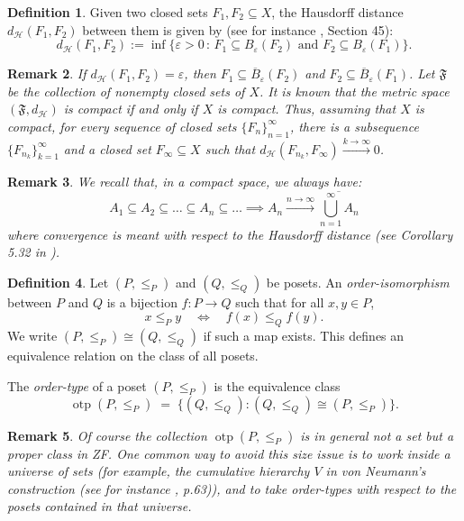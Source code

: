 \documentclass[10pt,a4paper]{article}
\theoremstyle{definition}
\newtheorem{defi}{Definition}[section]
\theoremstyle{remark}
\theoremstyle{plain}
\newtheorem{rem}[defi]{Remark}
\begin{document}
\begin{defi}
    Given two closed sets $F_1,F_2\subseteq X$, the Hausdorff distance $d_{\mathcal{H}}(F_1,F_2)$ between them is given by (see for instance \cite{munkres2013}, Section 45):
    $$d_\mathcal{H}(F_1,F_2):=\inf\{\varepsilon>0\,:\,F_1\subseteq B_\varepsilon(F_2)\text{ and }F_2\subseteq B_\varepsilon(F_1)\}.$$
\end{defi}
\begin{rem}
    If $d_\mathcal{H}(F_1,F_2)=\varepsilon$, then $F_1\subseteq\overline{B}_\varepsilon(F_2)$ and $F_2\subseteq\overline{B}_\varepsilon(F_1)$.
    Let $\mathfrak{F}$ be the collection of nonempty closed sets of $X$. It is known that the metric space $(\mathfrak{F},d_\mathcal{H})$ is compact if and only if $X$ is compact. Thus, assuming that $X$ is compact, for every sequence of closed sets $\{F_n\}_{n=1}^\infty$, there is a subsequence $\{F_{n_k}\}_{k=1}^\infty$ and a closed set $F_\infty\subseteq X$ such that $d_\mathcal{H}(F_{n_k},F_\infty)\xrightarrow{k\to\infty}0$.
\end{rem}
\begin{rem}
    We recall that, in a compact space, we always have:
\begin{equation}\label{nest_haus}
A_1\subseteq A_2\subseteq\dots \subseteq A_n\subseteq\dots \implies A_n\xrightarrow{n\to\infty}\overline{\bigcup_{n=1}^\infty A_n}
\end{equation}
where convergence is meant with respect to the Hausdorff distance (see Corollary 5.32 in \cite{Tuzhilin}).
\end{rem}

\begin{defi}
    Let $(P,\leq_P)$ and $(Q,\leq_Q)$ be posets. An \emph{order-isomorphism} between $P$ and $Q$ is a bijection $f : P \to Q$ such that for all $x,y \in P$,
    $$x \leq_P y \quad \Longleftrightarrow \quad f(x) \leq_Q f(y).$$
    We write $(P,\leq_P) \cong (Q,\leq_Q)$ if such a map exists. This defines an equivalence relation on the class of all posets.

    The \emph{order-type} of a poset $(P,\leq_P)$ is the equivalence class
    $$\operatorname{otp}(P,\leq_P) \;=\; \{ (Q,\leq_Q) : (Q,\leq_Q) \cong (P,\leq_P) \}.$$
\end{defi}

\begin{rem}
    Of course the collection $\operatorname{otp}(P,\leq_P)$ is in general not a set 
    but a proper class in ZF. 
    One common way to avoid this size issue is to work inside a 
    \emph{universe of sets} (for example, the cumulative hierarchy $V$ 
    in von Neumann's construction (see for instance \cite{Jech}, p.63)), and to take order-types with respect to 
    the posets contained in that universe. 
\end{rem}
\end{document}
